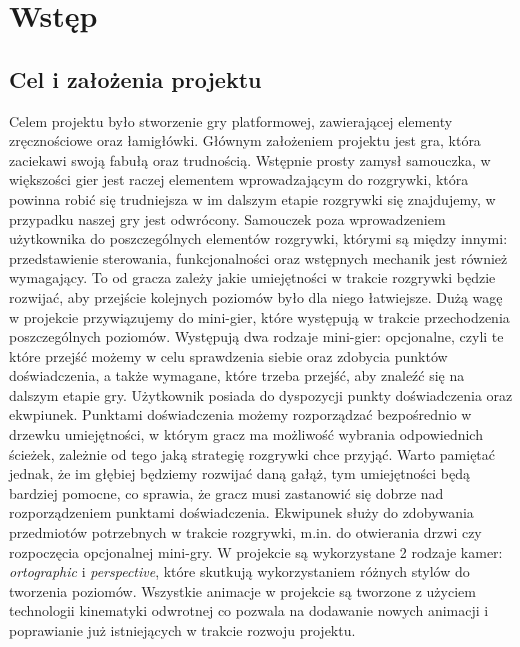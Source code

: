 \documentclass[oneside,polski,logo]{amuthesis}
\begin{document}

\chapter{Wstęp}
\section{Cel i założenia projektu}
Celem projektu było stworzenie gry platformowej, zawierającej elementy zręcznościowe oraz łamigłówki. Głównym założeniem projektu jest gra, która zaciekawi swoją fabułą oraz trudnością. Wstępnie prosty zamysł samouczka, w większości gier jest raczej elementem wprowadzającym do rozgrywki, która powinna robić się trudniejsza w im dalszym etapie rozgrywki się znajdujemy, w przypadku naszej gry jest odwrócony. Samouczek poza wprowadzeniem użytkownika do poszczególnych elementów rozgrywki, którymi są między innymi: przedstawienie sterowania, funkcjonalności oraz wstępnych mechanik jest również wymagający. To od gracza zależy jakie umiejętności w trakcie rozgrywki będzie rozwijać, aby przejście kolejnych poziomów było dla niego łatwiejsze. Dużą wagę w projekcie przywiązujemy do mini-gier, które występują w trakcie przechodzenia poszczególnych poziomów. Występują dwa rodzaje mini-gier: opcjonalne, czyli te które przejść możemy w celu sprawdzenia siebie oraz zdobycia punktów doświadczenia, a także wymagane, które trzeba przejść, aby znaleźć się na dalszym etapie gry. Użytkownik posiada do dyspozycji punkty doświadczenia oraz ekwpiunek. Punktami doświadczenia możemy rozporządzać bezpośrednio w drzewku umiejętności, w którym gracz ma możliwość wybrania odpowiednich ścieżek, zależnie od tego jaką strategię rozgrywki chce przyjąć. Warto pamiętać jednak, że im głębiej będziemy rozwijać daną gałąż, tym umiejętności będą bardziej pomocne, co sprawia, że gracz musi zastanowić się dobrze nad rozporządzeniem punktami doświadczenia. Ekwipunek służy do zdobywania przedmiotów potrzebnych w trakcie rozgrywki, m.in. do otwierania drzwi czy rozpoczęcia opcjonalnej mini-gry. W projekcie są wykorzystane 2 rodzaje kamer: \emph{ortographic} i \emph{perspective}, które skutkują wykorzystaniem różnych stylów do tworzenia poziomów. Wszystkie animacje w projekcie są tworzone z użyciem technologii kinematyki odwrotnej co pozwala na dodawanie nowych animacji i poprawianie już istniejących w trakcie rozwoju projektu.
\end{document}
